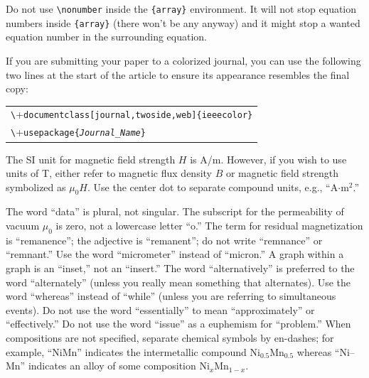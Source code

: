 \documentclass[journal,twoside,web]{ieeecolor2}
\begin{document}
Do not use \verb|\nonumber| inside the \verb|{array}| environment. It
will not stop equation numbers inside \verb|{array}| (there won't be
any anyway) and it might stop a wanted equation number in the
surrounding equation.

If you are submitting your paper to a colorized journal, you can use
the following two lines at the start of the article to ensure its
appearance resembles the final copy:

\smallskip\noindent
\begin{small}
\begin{tabular}{l}
\verb+\+\texttt{documentclass[journal,twoside,web]\{ieeecolor\}}\\
\verb+\+\texttt{usepackage\{\textit{Journal\_Name}\}}
\end{tabular}
\end{small}

The SI unit for magnetic field strength $H$ is A/m. However, if you wish to use 
units of T, either refer to magnetic flux density $B$ or magnetic field 
strength symbolized as $\mu _{0}H$. Use the center dot to separate 
compound units, e.g., ``A$\cdot $m$^{2}$.''

The word ``data'' is plural, not singular. The subscript for the 
permeability of vacuum $\mu _{0}$ is zero, not a lowercase letter 
``o.'' The term for residual magnetization is ``remanence''; the adjective 
is ``remanent''; do not write ``remnance'' or ``remnant.'' Use the word 
``micrometer'' instead of ``micron.'' A graph within a graph is an 
``inset,'' not an ``insert.'' The word ``alternatively'' is preferred to the 
word ``alternately'' (unless you really mean something that alternates). Use 
the word ``whereas'' instead of ``while'' (unless you are referring to 
simultaneous events). Do not use the word ``essentially'' to mean 
``approximately'' or ``effectively.'' Do not use the word ``issue'' as a 
euphemism for ``problem.'' When compositions are not specified, separate 
chemical symbols by en-dashes; for example, ``NiMn'' indicates the 
intermetallic compound Ni$_{0.5}$Mn$_{0.5}$ whereas 
``Ni--Mn'' indicates an alloy of some composition 
Ni$_{x}$Mn$_{1-x}$.
\end{document}

